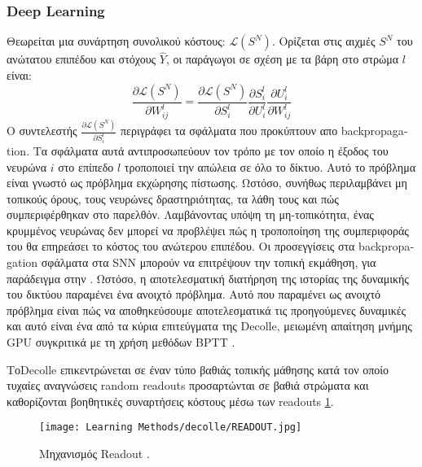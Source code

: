 \documentclass[12pt]{report}
\begin{document}
\subsubsection{Deep Learning}
Θεωρείται μια συνάρτηση συνολικού κόστους: $\mathcal{L}\left(S^{N}\right)$. Ορίζεται στις αιχμές $S^{N} $ του ανώτατου επιπέδου και στόχους $\hat{Y}$, οι παράγωγοι σε σχέση με τα βάρη στο στρώμα $l$ είναι:
\begin{equation}
\frac{\partial \mathcal{L}\left(S^{N}\right)}{\partial W_{i j}^{l}}=\frac{\partial \mathcal{L}\left(S^{N}\right)}{\partial S_{i}^{l}} \frac{\partial S_{i}^{l}}{\partial U_{i}^{l}} \frac{\partial U_{i}^{l}}{\partial W_{i j}^{l}}
\end{equation}
Ο συντελεστής $\frac{\partial \mathcal{L}\left(S^{N}\right)}{\partial S_{i}^{l}}$ περιγράφει τα σφάλματα που προκύπτουν απο \textlatin{backpropagation}. Τα σφάλματα αυτά αντιπροσωπεύουν τον τρόπο με τον οποίο η έξοδος του νευρώνα $i$ στο επίπεδο $l$ τροποποιεί την απώλεια σε όλο το δίκτυο. Αυτό το πρόβλημα είναι γνωστό ως πρόβλημα εκχώρησης πίστωσης. Ωστόσο, συνήθως περιλαμβάνει μη τοπικούς όρους, τους νευρώνες δραστηριότητας, τα λάθη τους και πώς συμπεριφέρθηκαν στο παρελθόν. Λαμβάνοντας υπόψη τη μη-τοπικότητα, ένας κρυμμένος νευρώνας δεν μπορεί να προβλέψει πώς η τροποποίηση της συμπεριφοράς του θα επηρεάσει το κόστος του ανώτερου επιπέδου. Οι προσεγγίσεις στα \textlatin{backpropagation} σφάλματα στα \textlatin{SNN} μπορούν να επιτρέψουν την τοπική εκμάθηση, για παράδειγμα στην \cite{lillicrap2016}. Ωστόσο, η αποτελεσματική διατήρηση της ιστορίας της δυναμικής του δικτύου παραμένει ένα ανοιχτό πρόβλημα. Αυτό που παραμένει ως ανοιχτό πρόβλημα είναι πώς να αποθηκεύσουμε αποτελεσματικά τις προηγούμενες δυναμικές και αυτό είναι ένα από τα κύρια επιτεύγματα της \textlatin{Decolle}, μειωμένη απαίτηση μνήμης GPU συγκριτικά με τη χρήση μεθόδων \textlatin{BPTT} .

Το\textlatin{Decolle} επικεντρώνεται σε έναν τύπο βαθιάς τοπικής μάθησης κατά τον οποίο τυχαίες αναγνώσεις \textlatin{random readouts} προσαρτώνται σε βαθιά στρώματα και καθορίζονται βοηθητικές συναρτήσεις κόστους μέσω των \textlatin{readouts} \ref{fig:readout}.
\begin{figure}[htp]
    \centering
    \texttt{[image: Learning Methods/decolle/READOUT.jpg]}
    \caption{Μηχανισμός \textlatin{Readout}  . 
    \label{fig:readout}}
\end{figure}
\end{document}

